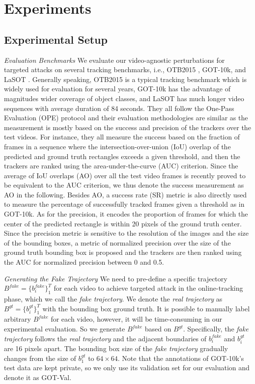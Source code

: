 \documentclass{article}
\newcommand{\ie}{i.e.}
\begin{document}
\section{Experiments}

\subsection{Experimental Setup}

\textit{Evaluation Benchmarks} We evaluate our video-agnostic perturbations for targeted attacks on several tracking benchmarks, \ie, OTB2015 \cite{OTB}, GOT-10k\cite{GOT-10k}, and LaSOT \cite{LaSOT}. Generally speaking, OTB2015 is a typical tracking benchmark which is widely used for evaluation for several years, GOT-10k has the advantage of magnitudes wider coverage of object classes, and LaSOT has much longer video sequences with average duration of 84 seconds. They all follow the One-Pass Evaluation (OPE) protocol and their evaluation methodologies are similar as the measurement is mostly based on the success and precision of the trackers over the test videos. For instance, they all measure the success based on the fraction of frames in a sequence where the intersection-over-union (IoU) overlap of the predicted and ground truth rectangles exceeds a given threshold, and then the trackers are ranked using the area-under-the-curve (AUC) criterion. Since the average of IoU overlaps (AO) over all the test video frames is recently proved to be equivalent to the AUC criterion, we thus denote the success measurement as AO in the following. Besides AO, a success rate (SR) metric is also directly used to measure the percentage of successfully tracked frames given a threshold as in GOT-10k. As for the precision, it encodes the proportion of frames for which the center of the predicted rectangle is within 20 pixels of the ground truth center. Since the precision metric is sensitive to the resolution of the images and the size of the bounding boxes, a metric of normalized precision over the size of the ground truth bounding box is proposed and the trackers are then ranked using the AUC for normalized precision between 0 and 0.5.

\textit{Generating the Fake Trajectory} We need to pre-define a specific trajectory $B^{fake}=\{b^{fake}_i\}_1^{T}$ for each video to achieve targeted attack in the online-tracking phase, which we call the \textit{fake trajectory}. We denote the \textit{real trajectory} as $B^{gt}=\{b^{gt}_i\}_1^T$ with the bounding box ground truth.
It is possible to manually label arbitrary $B^{fake}$ for each video, however, it will be time-consuming in our experimental evaluation. So we generate $B^{fake}$ based on $B^{gt}$. Specifically, the \textit{fake trajectory} follows the \textit{real trajectory} and the adjacent boundaries of $b^{fake}_i$ and $b^{gt}_i$ are 16 pixels apart.
The bounding box size of the \textit{fake trajectory} gradually changes from the size of $b^{gt}_1$ to $64\times 64$. Note that the annotations of GOT-10k's test data are kept private, so we only use its validation set for our evaluation and denote it as GOT-Val.
\end{document}
